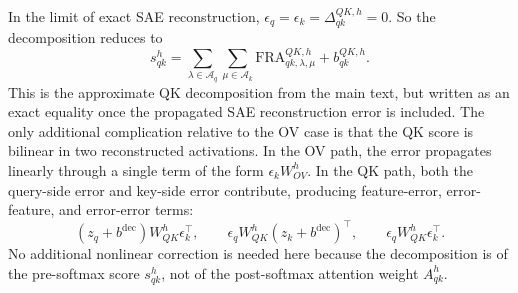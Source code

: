 \documentclass[10pt]{article}
\theoremstyle{definition}
\newcommand{\1}{\mathbf{1}}
\newcommand{\dec}{\mathrm{dec}}
\begin{document}
In the limit of exact SAE reconstruction, $\epsilon_q = \epsilon_k = \Delta_{qk}^{QK,h} = 0$. So the decomposition reduces to
\begin{equation}
    s_{qk}^h
    =
    \sum_{\lambda \in \mathcal A_q}
    \sum_{\mu \in \mathcal A_k}
    \mathrm{FRA}_{qk,\lambda,\mu}^{QK,h}
    +
    b_{qk}^{QK,h}.
\end{equation}
This is the approximate QK decomposition from the main text, but written as an exact equality once the propagated SAE reconstruction error is included. The only additional complication relative to the OV case is that the QK score is bilinear in two reconstructed activations. In the OV path, the error propagates linearly through a single term of the form $\epsilon_k W_{OV}^h$. In the QK path, both the query-side error and key-side error contribute, producing feature-error, error-feature, and error-error terms:
\[
    (z_q+b^\dec)W_{QK}^h\epsilon_k^\top,
    \qquad
    \epsilon_q W_{QK}^h(z_k+b^\dec)^\top,
    \qquad
    \epsilon_q W_{QK}^h\epsilon_k^\top.
\]
No additional nonlinear correction is needed here because the decomposition is of the pre-softmax score $s_{qk}^h$, not of the post-softmax attention weight $A_{qk}^h$.
\end{document}

